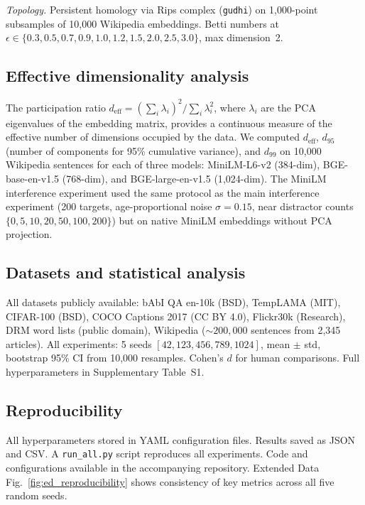 \documentclass[11pt]{article}
\begin{document}
\textit{Topology.} Persistent homology via Rips complex (\texttt{gudhi}\cite{gudhi2014}) on 1{,}000-point subsamples of 10{,}000 Wikipedia embeddings. Betti numbers at $\epsilon \in \{0.3, 0.5, 0.7, 0.9, 1.0, 1.2, 1.5, 2.0, 2.5, 3.0\}$, max dimension~2.

\subsection*{Effective dimensionality analysis}

The participation ratio $d_\text{eff} = (\sum_i \lambda_i)^2 / \sum_i \lambda_i^2$, where $\lambda_i$ are the PCA eigenvalues of the embedding matrix, provides a continuous measure of the effective number of dimensions occupied by the data. We computed $d_\text{eff}$, $d_{95}$ (number of components for 95\% cumulative variance), and $d_{99}$ on 10{,}000 Wikipedia sentences for each of three models: MiniLM-L6-v2 (384-dim), BGE-base-en-v1.5 (768-dim), and BGE-large-en-v1.5 (1{,}024-dim). The MiniLM interference experiment used the same protocol as the main interference experiment (200 targets, age-proportional noise $\sigma = 0.15$, near distractor counts $\{0, 5, 10, 20, 50, 100, 200\}$) but on native MiniLM embeddings without PCA projection.

\subsection*{Datasets and statistical analysis}

All datasets publicly available: bAbI QA en-10k (BSD), TempLAMA (MIT), CIFAR-100 (BSD), COCO Captions 2017 (CC BY 4.0), Flickr30k (Research), DRM word lists\cite{roediger1995} (public domain), Wikipedia (${\sim}200{,}000$ sentences from 2{,}345 articles). All experiments: 5 seeds $[42, 123, 456, 789, 1024]$, mean $\pm$ std, bootstrap 95\% CI from 10{,}000 resamples. Cohen's $d$ for human comparisons. Full hyperparameters in Supplementary Table~S1.

\subsection*{Reproducibility}

All hyperparameters stored in YAML configuration files. Results saved as JSON and CSV. A \texttt{run\_all.py} script reproduces all experiments. Code and configurations available in the accompanying repository. Extended Data Fig.~\ref{fig:ed_reproducibility} shows consistency of key metrics across all five random seeds.
\end{document}
